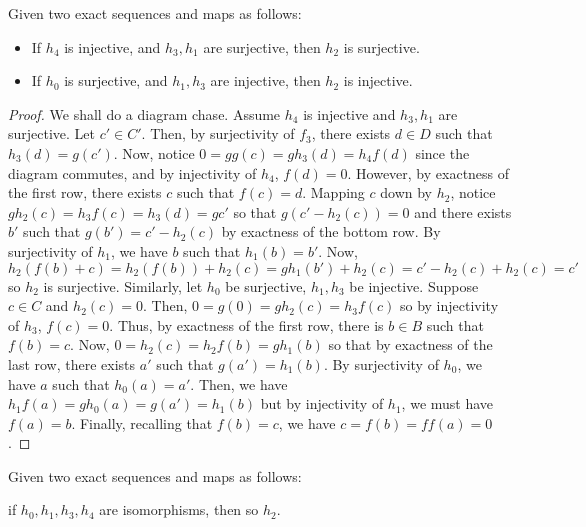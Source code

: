 \documentclass[12pt,reqno]{amsart}
\numberwithin{theorem}{section}
\theoremstyle{definition}
\theoremstyle{remark}
\numberwithin{equation}{section}
\theoremstyle{definition}
\begin{document}
\begin{lemma}
    Given two exact sequences and maps as follows:
    \begin{center}
\end{center}
\begin{itemize}
    \item If $h_4$ is injective, and $h_3,h_1$ are surjective, then $h_2$ is surjective.
    \item If $h_0$ is surjective, and $h_1, h_3$ are injective, then $h_2$ is injective.
\end{itemize}
\begin{proof}
    We shall do a diagram chase. Assume $h_4$ is injective and $h_3,h_1$ are surjective. Let $c' \in C'$. Then, by surjectivity of $f_3$, there exists $d \in D$ such that $h_3(d) = g(c') $. Now, notice $0=gg(c)=gh_3(d)=h_4f(d)$ since the diagram commutes, and by injectivity of $h_4$, $f(d) = 0$. However, by exactness of the first row, there exists $c$ such that $f(c)=d$. Mapping $c$ down by $h_2$, notice $gh_2(c)=h_3f(c)=h_3(d)=gc'$ so that $g(c'-h_2(c)) = 0$ and there exists $b'$ such that $g(b')=c'-h_2(c)$ by exactness of the bottom row. By surjectivity of $h_1$, we have $b$ such that $h_1(b) = b'$. Now, $$h_2(f(b)+c) =  h_2(f(b))+h_2(c)=gh_1(b')+h_2(c) =c'- h_2(c)+h_2(c)=c'$$
    so $h_2$ is surjective. Similarly, let $h_0$ be surjective, $h_1,h_3$ be injective. Suppose $c \in C$ and $h_2(c) = 0$. Then, $0=g(0)=gh_2(c)=h_3f(c)$ so by injectivity of $h_3$, $f(c) = 0$. Thus, by exactness of the first row, there is $b \in B$ such that $f(b) = c$. Now, $0=h_2(c)=h_2f(b)=gh_1(b) $ so that by exactness of the last row, there exists $a'$ such that $g(a')=h_1(b)$. By surjectivity of $h_0$, we have $a$ such that $h_0(a) = a'$. Then, we have $h_1f(a) = gh_0(a) = g(a')=h_1(b)$ but by injectivity of $h_1$, we must have $f(a)=b$. Finally, recalling that $f(b) = c$, we have $c = f(b)=ff(a)=0$.
\end{proof}
\end{lemma}
\begin{corollary}
    Given two exact sequences and maps as follows:
    \begin{center}
\end{center}
    if $ h_0,h_1,h_3,h_4$ are isomorphisms, then so $h_2$.
\end{corollary}
\end{document}
